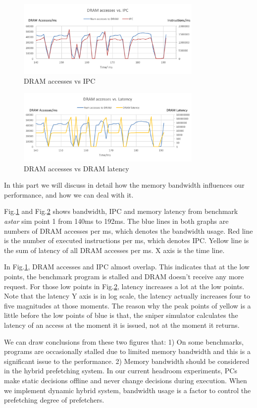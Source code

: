     \begin{figure}[h]
	   \centering
	   \includegraphics[width=0.8\textwidth]{images/bandwidth_IPC.png}
	   \caption{DRAM accesses vs IPC}
	  \label{fig:bandwidth_IPC}
  \end{figure}
  \begin{figure}[h]
	   \centering
	   \includegraphics[width=0.8\textwidth]{images/bandwidth_latency.png}
	   \caption{DRAM accesses vs DRAM latency}
	  \label{fig:bandwidth_latency}
  \end{figure}
In this part we will discuss in detail how the memory bandwidth influences our performance, and how we can deal with it.\par
Fig.\ref{fig:bandwidth_IPC} and Fig.\ref{fig:bandwidth_latency} shows bandwidth, IPC and memory latency from benchmark \emph{astar} sim point 1 from 140ms to 192ms. The blue lines in both graphs are numbers of DRAM accesses per ms, which denotes the bandwidth usage. Red line is the number of executed instructions per ms, which denotes IPC. Yellow line is the sum of latency of all DRAM accesses per ms. X axis is the time line.\par
In Fig.\ref{fig:bandwidth_IPC}, DRAM accesses and IPC almost overlap. This indicates that at the low points, the benchmark program is stalled and DRAM doesn't receive any more request. For those low points in Fig.\ref{fig:bandwidth_latency}, latency increases a lot at the low points. Note that the latency Y axis is in log scale, the latency actually increases four to five magnitudes at those moments. The reason why the peak points of yellow is a little before the low points of blue is that, the sniper simulator calculates the latency of an access at the moment it is issued, not at the moment it returns.\par
 We can draw conclusions from these two figures that: 1) On some benchmarks, programs are occasionally stalled due to limited memory bandwidth and this is a significant issue to the performance. 2) Memory bandwidth should be considered in the hybrid prefetching system.  In our current headroom experiments, PCs make static decisions offline and never change decisions during execution. When we implement dynamic hybrid system, bandwidth usage is a factor to control the prefetching degree of prefetchers. \par


